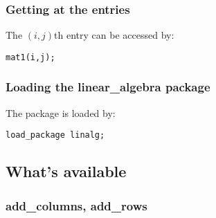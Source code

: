 \subsubsection*{Getting at the entries}

The $(i,j)$th entry can be accessed by:

\texttt{mat1(i,j);}

\subsubsection*{Loading the linear\_algebra package}

The package is loaded by:

\texttt{load\_package linalg;}


\subsection{What's available}

\label{linalg:subsec3}

\subsubsection{add\_columns, add\_rows}
\label{linalg:add_columns}
\hypertarget{operator:ADD_COLUMNS}{}

